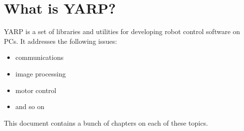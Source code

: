 
\section{What is YARP?}

YARP is a set of libraries and utilities for developing robot control
software on PCs.  It addresses the following issues:

\begin{itemize}

\item communications

\item image processing

\item motor control

\item and so on

\end{itemize}

This document contains a bunch of chapters on each of these topics.




